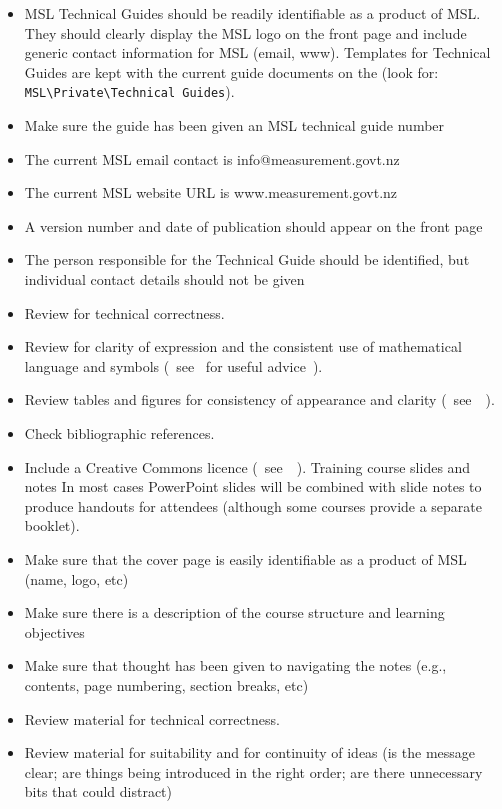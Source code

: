 \begin{itemize}
\item MSL Technical Guides should be readily identifiable as a product of MSL. They should clearly display the MSL logo on the front page and include generic contact information for MSL (email, www). Templates for Technical Guides are kept with the current guide documents on the   (look for: 
\verb|MSL\Private\Technical Guides|).
\item  Make sure the guide has been given an MSL technical guide number
\item  The current MSL email contact is info@measurement.govt.nz
\item  The current MSL website URL is www.measurement.govt.nz
\item   A version number and date of publication should appear on the front page
\item  The person responsible for the Technical Guide should be identified, but individual contact details should not be given
\item  Review for technical correctness.
\item  Review for clarity of expression and the consistent use of mathematical language and symbols (~see~\cite[\S\ref*{GRP-s:scientific_documents}]{MSL_Reporting_Guidelines} for useful advice~).
\item  Review tables and figures for consistency of appearance and clarity (~see~\cite[\S\ref*{GRP-s:scientific_documents}]{MSL_Reporting_Guidelines}~).
\item  Check bibliographic references. 
\item  Include a Creative Commons licence (~see~\cite[\S\ref*{GRP-s_copyright}]{MSL_Reporting_Guidelines}~).
 Training course slides and notes
In most cases PowerPoint slides will be combined with slide notes to produce handouts for attendees (although some courses provide a separate booklet). 
\item  Make sure that the cover page is easily identifiable as a product of MSL (name, logo, etc)
\item  Make sure there is a description of the course structure and learning objectives
\item  Make sure that thought has been given to navigating the notes (e.g., contents, page numbering, section breaks, etc) 
\item  Review material for technical correctness.
\item  Review material for suitability and for continuity of ideas (is the message clear; are things being introduced in the right order; are there unnecessary bits that could distract)

\end{itemize}
